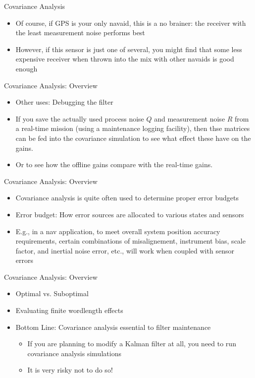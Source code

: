 \begin{frame}
Covariance Analysis
\begin{itemize}
  \item Of course, if GPS is your only navaid, this is a no brainer:  the receiver with the least measurement noise performs best
  \item However, if this sensor is just one of several, you might find that some less expensive receiver when thrown into the mix with other navaids is good enough 
\end{itemize} 
\end{frame}

\begin{frame}
Covariance Analysis: Overview
\begin{itemize}
  \item Other uses: Debugging the filter
  \item If you save the actually used process noise $Q$ and measurement noise $R$ from a real-time mission (using a maintenance logging facility), then thse matrices can be fed into the covariance simulation to see what effect these have on the gains.
  \item Or to see how the offline gains compare with the real-time gains.
\end{itemize} 
\end{frame}

\begin{frame}
Covariance Analysis: Overview
\begin{itemize}
  \item Covariance analysis is quite often used to determine proper error budgets
  \item Error budget:  How error sources are allocated to various states and sensors
  \item E.g., in a nav application, to meet overall system position accuracy requirements, certain combinations of misalignement, instrument bias, scale factor, and inertial noise error, etc., will work when coupled with sensor errors
\end{itemize} 
\end{frame}

\begin{frame}
Covariance Analysis: Overview
\begin{itemize}
  \item Optimal vs. Suboptimal
  \item Evaluating finite wordlength effects 
  \item Bottom Line: Covariance analysis essential to filter maintenance
	\begin{itemize}
		\item If you are planning to modify a Kalman filter at all, you need to run covariance analysis simulations
		\item It is very risky not to do so!
	\end{itemize}
\end{itemize} 
\end{frame}
